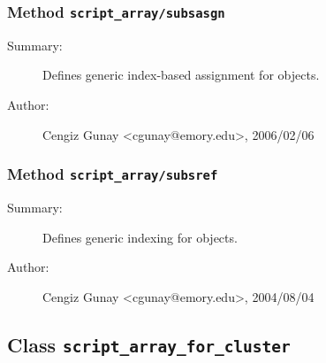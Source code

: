 \subsubsection[Method \texttt{subsasgn}]{Method \texttt{script\_array/subsasgn}}%
%
\label{ref_script_array__subsasgn}%
\hypertarget{ref_script_array__subsasgn}{}%
\begin{description}
\item[Summary:]Defines generic index-based assignment for objects.
%
%
%
%
%
%
%
\item[Author:]%
Cengiz Gunay <cgunay@emory.edu>, 2006/02/06
%
\end{description}
\methodline%
\subsubsection[Method \texttt{subsref}]{Method \texttt{script\_array/subsref}}%
%
\label{ref_script_array__subsref}%
\hypertarget{ref_script_array__subsref}{}%
\begin{description}
\item[Summary:]Defines generic indexing for objects.
%
%
%
%
%
%
%
\item[Author:]%
Cengiz Gunay <cgunay@emory.edu>, 2004/08/04
%
\end{description}
\methodline%
\subsection{Class \texttt{script\_array\_for\_cluster}}%
%
\label{ref_script_array_for_cluster}%
\hypertarget{ref_script_array_for_cluster}{}%
